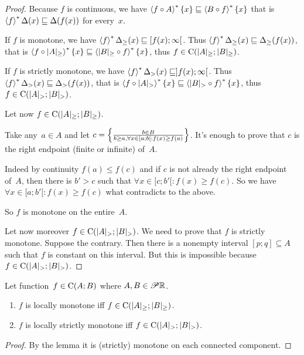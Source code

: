 \begin{proof}
Because $f$ is continuous, we have $\left\langle f\circ A\right\rangle ^{\ast}\{x\} \sqsubseteq \left\langle B\circ f\right\rangle ^{\ast}\{x\}$
that is $\left\langle f\right\rangle ^{\ast} \Delta(x) \sqsubseteq \Delta(f(x))$ for every~$x$.

If $f$ is monotone, we have $\left\langle f\right\rangle ^{\ast} \Delta_{\geq}(x) \sqsubseteq [f(x);\infty[$.
Thus $\left\langle f\right\rangle ^{\ast} \Delta_{\geq}(x) \sqsubseteq \Delta_{\geq}(f(x))$, that is
$\left\langle f\circ |A|_{\geq}\right\rangle ^{\ast}\{x\} \sqsubseteq \left\langle |B|_{\geq}\circ f\right\rangle ^{\ast}\{x\}$, thus
$f\in\mathrm{C}(|A|_{\geq};|B|_{\geq})$.

If $f$ is strictly monotone, we have $\left\langle f\right\rangle ^{\ast} \Delta_{>}(x) \sqsubseteq ]f(x);\infty[$.
Thus $\left\langle f\right\rangle ^{\ast} \Delta_{>}(x) \sqsubseteq \Delta_{>}(f(x))$, that is
$\left\langle f\circ |A|_{>}\right\rangle ^{\ast}\{x\} \sqsubseteq \left\langle |B|_{>}\circ f\right\rangle ^{\ast}\{x\}$, thus
$f\in\mathrm{C}(|A|_{>};|B|_{>})$.

Let now $f\in\mathrm{C}(|A|_{\geq};|B|_{\geq})$.

Take any~$a\in A$ and let $c=\left\{ \frac{b\in B}{b\geq a, \forall x\in[a;b[: f(x)\geq f(a)}\right\}$.
It's enough to prove that $c$ is the right endpoint (finite or infinite) of~$A$.

Indeed by continuity $f(a)\leq f(c)$ and if $c$ is not already the right endpoint of~$A$, then
there is $b'>c$ such that $\forall x\in[c;b'[: f(x)\geq f(c)$.
So we have $\forall x\in[a;b'[: f(x)\geq f(c)$ what contradicts to the above.

So $f$ is monotone on the entire~$A$.

Let now moreover $f\in\mathrm{C}(|A|_{>};|B|_{>})$. We need to prove that $f$ is strictly monotone.
Suppose the contrary. Then there is a nonempty interval $[p;q]\subseteq A$ such that $f$ is constant on this interval.
But this is impossible because $f\in\mathrm{C}(|A|_{>};|B|_{>})$.
\end{proof}

\begin{thm}
Let function~$f\in\mathrm{C}(A;B)$ where $A,B\in\mathscr{P}\mathbb{R}$.
\begin{enumerate}
\item $f$ is locally monotone iff $f\in\mathrm{C}(|A|_{\geq};|B|_{\geq})$.
\item $f$ is locally strictly monotone iff $f\in\mathrm{C}(|A|_{>};|B|_{>})$.
\end{enumerate}
\end{thm}

\begin{proof}
By the lemma it is (strictly) monotone on each connected component.
\end{proof}


